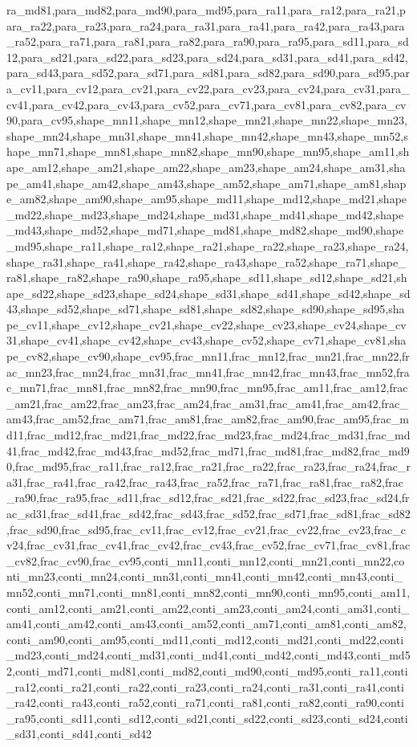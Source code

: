 ra_md81,para_md82,para_md90,para_md95,para_ra11,para_ra12,para_ra21,para_ra22,para_ra23,para_ra24,para_ra31,para_ra41,para_ra42,para_ra43,para_ra52,para_ra71,para_ra81,para_ra82,para_ra90,para_ra95,para_sd11,para_sd12,para_sd21,para_sd22,para_sd23,para_sd24,para_sd31,para_sd41,para_sd42,para_sd43,para_sd52,para_sd71,para_sd81,para_sd82,para_sd90,para_sd95,para_cv11,para_cv12,para_cv21,para_cv22,para_cv23,para_cv24,para_cv31,para_cv41,para_cv42,para_cv43,para_cv52,para_cv71,para_cv81,para_cv82,para_cv90,para_cv95,shape_mn11,shape_mn12,shape_mn21,shape_mn22,shape_mn23,shape_mn24,shape_mn31,shape_mn41,shape_mn42,shape_mn43,shape_mn52,shape_mn71,shape_mn81,shape_mn82,shape_mn90,shape_mn95,shape_am11,shape_am12,shape_am21,shape_am22,shape_am23,shape_am24,shape_am31,shape_am41,shape_am42,shape_am43,shape_am52,shape_am71,shape_am81,shape_am82,shape_am90,shape_am95,shape_md11,shape_md12,shape_md21,shape_md22,shape_md23,shape_md24,shape_md31,shape_md41,shape_md42,shape_md43,shape_md52,shape_md71,shape_md81,shape_md82,shape_md90,shape_md95,shape_ra11,shape_ra12,shape_ra21,shape_ra22,shape_ra23,shape_ra24,shape_ra31,shape_ra41,shape_ra42,shape_ra43,shape_ra52,shape_ra71,shape_ra81,shape_ra82,shape_ra90,shape_ra95,shape_sd11,shape_sd12,shape_sd21,shape_sd22,shape_sd23,shape_sd24,shape_sd31,shape_sd41,shape_sd42,shape_sd43,shape_sd52,shape_sd71,shape_sd81,shape_sd82,shape_sd90,shape_sd95,shape_cv11,shape_cv12,shape_cv21,shape_cv22,shape_cv23,shape_cv24,shape_cv31,shape_cv41,shape_cv42,shape_cv43,shape_cv52,shape_cv71,shape_cv81,shape_cv82,shape_cv90,shape_cv95,frac_mn11,frac_mn12,frac_mn21,frac_mn22,frac_mn23,frac_mn24,frac_mn31,frac_mn41,frac_mn42,frac_mn43,frac_mn52,frac_mn71,frac_mn81,frac_mn82,frac_mn90,frac_mn95,frac_am11,frac_am12,frac_am21,frac_am22,frac_am23,frac_am24,frac_am31,frac_am41,frac_am42,frac_am43,frac_am52,frac_am71,frac_am81,frac_am82,frac_am90,frac_am95,frac_md11,frac_md12,frac_md21,frac_md22,frac_md23,frac_md24,frac_md31,frac_md41,frac_md42,frac_md43,frac_md52,frac_md71,frac_md81,frac_md82,frac_md90,frac_md95,frac_ra11,frac_ra12,frac_ra21,frac_ra22,frac_ra23,frac_ra24,frac_ra31,frac_ra41,frac_ra42,frac_ra43,frac_ra52,frac_ra71,frac_ra81,frac_ra82,frac_ra90,frac_ra95,frac_sd11,frac_sd12,frac_sd21,frac_sd22,frac_sd23,frac_sd24,frac_sd31,frac_sd41,frac_sd42,frac_sd43,frac_sd52,frac_sd71,frac_sd81,frac_sd82,frac_sd90,frac_sd95,frac_cv11,frac_cv12,frac_cv21,frac_cv22,frac_cv23,frac_cv24,frac_cv31,frac_cv41,frac_cv42,frac_cv43,frac_cv52,frac_cv71,frac_cv81,frac_cv82,frac_cv90,frac_cv95,conti_mn11,conti_mn12,conti_mn21,conti_mn22,conti_mn23,conti_mn24,conti_mn31,conti_mn41,conti_mn42,conti_mn43,conti_mn52,conti_mn71,conti_mn81,conti_mn82,conti_mn90,conti_mn95,conti_am11,conti_am12,conti_am21,conti_am22,conti_am23,conti_am24,conti_am31,conti_am41,conti_am42,conti_am43,conti_am52,conti_am71,conti_am81,conti_am82,conti_am90,conti_am95,conti_md11,conti_md12,conti_md21,conti_md22,conti_md23,conti_md24,conti_md31,conti_md41,conti_md42,conti_md43,conti_md52,conti_md71,conti_md81,conti_md82,conti_md90,conti_md95,conti_ra11,conti_ra12,conti_ra21,conti_ra22,conti_ra23,conti_ra24,conti_ra31,conti_ra41,conti_ra42,conti_ra43,conti_ra52,conti_ra71,conti_ra81,conti_ra82,conti_ra90,conti_ra95,conti_sd11,conti_sd12,conti_sd21,conti_sd22,conti_sd23,conti_sd24,conti_sd31,conti_sd41,conti_sd42